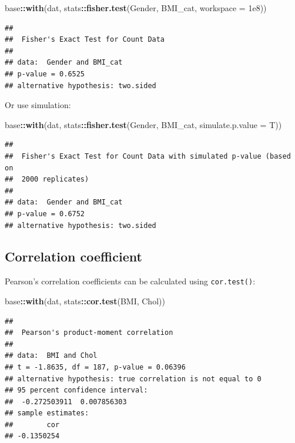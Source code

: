 \documentclass[
]{book}
\newenvironment{Shaded}{\begin{snugshade}}{\end{snugshade}}
\newcommand{\AttributeTok}[1]{\textcolor[rgb]{0.13,0.29,0.53}{#1}}
\newcommand{\FloatTok}[1]{\textcolor[rgb]{0.00,0.00,0.81}{#1}}
\newcommand{\FunctionTok}[1]{\textcolor[rgb]{0.13,0.29,0.53}{\textbf{#1}}}
\newcommand{\NormalTok}[1]{#1}
\newcommand{\SpecialCharTok}[1]{\textcolor[rgb]{0.81,0.36,0.00}{\textbf{#1}}}
\begin{document}
\begin{Shaded}
\begin{Highlighting}[]
\NormalTok{base}\SpecialCharTok{::}\FunctionTok{with}\NormalTok{(dat, stats}\SpecialCharTok{::}\FunctionTok{fisher.test}\NormalTok{(Gender, BMI\_cat, }\AttributeTok{workspace =} \FloatTok{1e8}\NormalTok{))}
\end{Highlighting}
\end{Shaded}

\begin{verbatim}
## 
##  Fisher's Exact Test for Count Data
## 
## data:  Gender and BMI_cat
## p-value = 0.6525
## alternative hypothesis: two.sided
\end{verbatim}

Or use simulation:

\begin{Shaded}
\begin{Highlighting}[]
\NormalTok{base}\SpecialCharTok{::}\FunctionTok{with}\NormalTok{(dat, stats}\SpecialCharTok{::}\FunctionTok{fisher.test}\NormalTok{(Gender, BMI\_cat, }\AttributeTok{simulate.p.value =}\NormalTok{ T))}
\end{Highlighting}
\end{Shaded}

\begin{verbatim}
## 
##  Fisher's Exact Test for Count Data with simulated p-value (based on
##  2000 replicates)
## 
## data:  Gender and BMI_cat
## p-value = 0.6752
## alternative hypothesis: two.sided
\end{verbatim}

\subsection{Correlation coefficient}\label{sec:pearson-Spearman}

Pearson's correlation coefficients can be calculated using \texttt{cor.test()}:

\begin{Shaded}
\begin{Highlighting}[]
\NormalTok{base}\SpecialCharTok{::}\FunctionTok{with}\NormalTok{(dat, stats}\SpecialCharTok{::}\FunctionTok{cor.test}\NormalTok{(BMI, Chol))}
\end{Highlighting}
\end{Shaded}

\begin{verbatim}
## 
##  Pearson's product-moment correlation
## 
## data:  BMI and Chol
## t = -1.8635, df = 187, p-value = 0.06396
## alternative hypothesis: true correlation is not equal to 0
## 95 percent confidence interval:
##  -0.272503911  0.007856303
## sample estimates:
##        cor 
## -0.1350254
\end{verbatim}
\end{document}
